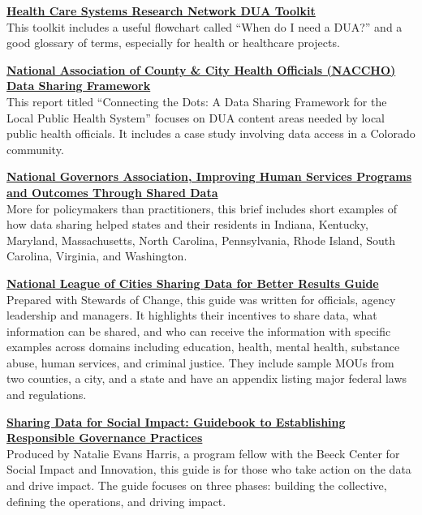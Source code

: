 \textbf{\href{http://www.hcsrn.org/asset/ce41ec1a-c071-4300-ac07-14cd653f234C/HCSRN_DUAToolkit.pdf}{Health Care Systems Research Network DUA Toolkit}}\\
This toolkit includes a useful flowchart called ``When do I need a DUA?'' and a good glossary of terms, especially for health or healthcare projects.

\textbf{\href{https://www.naccho.org/uploads/downloadable-resources/Issue-Brief-Data-Sharing-Framework-NA592.pdf}{National Association of County \& City Health Officials (NACCHO) Data Sharing Framework}}\\
This report titled ``Connecting the Dots: A Data Sharing Framework for the Local Public Health System'' focuses on DUA content areas needed by local public health officials. It includes a case study involving data access in a Colorado community.

\textbf{\href{http://natlgovassoc.wpengine.com/wp-content/uploads/2018/07/1609ImprovingHumanServicesSharedData.pdf}{National Governors Association, Improving Human Services Programs and Outcomes Through Shared Data}}\\
More for policymakers than practitioners, this brief includes short examples of how data sharing helped states and their residents in Indiana, Kentucky, Maryland, Massachusetts, North Carolina, Pennsylvania, Rhode Island, South Carolina, Virginia, and Washington.

\textbf{\href{https://www.nlc.org/sharing-data-for-better-results}{National League of Cities Sharing Data for Better Results Guide}}\\
Prepared with Stewards of Change, this guide was written for officials, agency leadership and managers. It highlights their incentives to share data, what information can be shared, and who can receive the information with specific examples across domains including education, health, mental health, substance abuse, human services, and criminal justice. They include sample MOUs from two counties, a city, and a state and have an appendix listing major federal laws and regulations.

\textbf{\href{https://beeckcenter.georgetown.edu/wp-content/uploads/2020/01/Data-Sharing-Report.pdf}{Sharing Data for Social Impact: Guidebook to Establishing Responsible Governance Practices}}\\
Produced by Natalie Evans Harris, a program fellow with the Beeck Center for Social Impact and Innovation, this guide is for those who take action on the data and drive impact. The guide focuses on three phases: building the collective, defining the operations, and driving impact.

